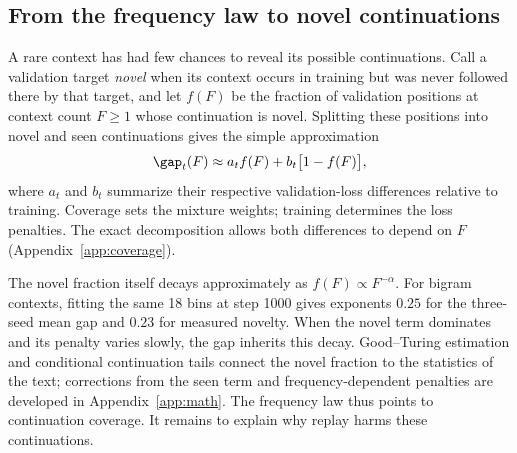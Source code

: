 \subsection{From the frequency law to novel continuations}
\label{sec:coverage}
A rare context has had few chances to reveal its possible continuations. Call a validation target \emph{novel} when its context occurs in training but was never followed there by that target, and let $f(F)$ be the fraction of validation positions at context count $F\ge1$ whose continuation is novel. Splitting these positions into novel and seen continuations gives the simple approximation
\begin{equation}
\gap_t(F)\approx a_t f(F)+b_t\big[1-f(F)\big],
\label{eq:coverage-main}
\end{equation}
where $a_t$ and $b_t$ summarize their respective validation-loss differences relative to training. Coverage sets the mixture weights; training determines the loss penalties. The exact decomposition allows both differences to depend on $F$ (Appendix~\ref{app:coverage}).

The novel fraction itself decays approximately as $f(F)\propto F^{-\alpha}$. For bigram contexts, fitting the same 18 bins at step 1000 gives exponents $0.25$ for the three-seed mean gap and $0.23$ for measured novelty. When the novel term dominates and its penalty varies slowly, the gap inherits this decay. Good--Turing estimation and conditional continuation tails connect the novel fraction to the statistics of the text; corrections from the seen term and frequency-dependent penalties are developed in Appendix~\ref{app:math}. The frequency law thus points to continuation coverage. It remains to explain why replay harms these continuations.
